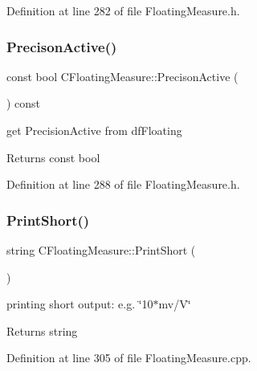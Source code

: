 Definition at line 282 of file Floating\+Measure.\+h.

\mbox{\label{classCFloatingMeasure_a90d47ac476295db3c208cb484cd75764}} 
\subsubsection{\texorpdfstring{Precison\+Active()}{PrecisonActive()}}
{\footnotesize\ttfamily const bool C\+Floating\+Measure\+::\+Precison\+Active (\begin{DoxyParamCaption}{ }\end{DoxyParamCaption}) const\hspace{0.3cm}{\ttfamily [inline]}}



get Precision\+Active from df\+Floating 

\begin{DoxyReturn}{Returns}
const bool 
\end{DoxyReturn}


Definition at line 288 of file Floating\+Measure.\+h.

\mbox{\label{classCFloatingMeasure_af4caaa697967a257bc6e13117843ff58}} 
\subsubsection{\texorpdfstring{Print\+Short()}{PrintShort()}}
{\footnotesize\ttfamily string C\+Floating\+Measure\+::\+Print\+Short (\begin{DoxyParamCaption}{ }\end{DoxyParamCaption})}



printing short output\+: e.\+g. \char`\"{}10$\ast$mv/\+V\char`\"{} 

\begin{DoxyReturn}{Returns}
string 
\end{DoxyReturn}


Definition at line 305 of file Floating\+Measure.\+cpp.



